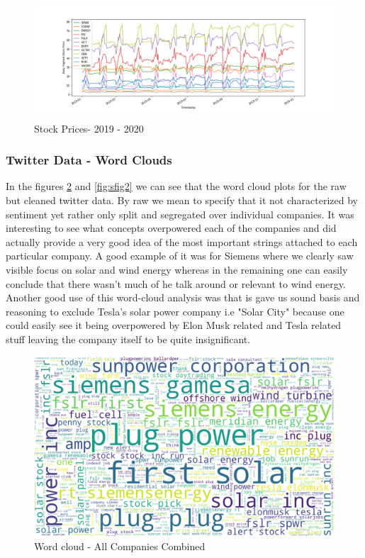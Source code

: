 \documentclass[sigconf, nonacm]{acmart}
\begin{document}
\begin{figure}[H]
  \centering
  \includegraphics[width=\linewidth]{images/stock_prices_all_2019t20.png}
  \caption{Stock Prices- 2019 - 2020}
  \label{stock_prices_all_2019t20}
\end{figure}




\subsubsection{Twitter Data - Word Clouds}
In the figures \ref{complete_wordcloud2} and \ref{fig:sfig2} we can see that the word cloud plots for the raw but cleaned twitter data. By raw we mean to specify that it not characterized by sentiment yet rather only split and segregated over individual companies. It was interesting to see what concepts overpowered each of the companies and did actually provide a very good idea of the most important strings attached to each particular company. A good example of it was for Siemens where we clearly saw visible focus on solar and wind energy whereas in the remaining one can easily conclude that there wasn't much of he talk around or relevant to wind energy. Another good use of this word-cloud analysis was that is gave us sound basis and reasoning to exclude Tesla's solar power company i.e "Solar City" because one could easily see it being overpowered by Elon Musk related and Tesla related stuff leaving the company itself to be quite insignificant. 

\begin{figure}[H]
  \centering
  \includegraphics[width=1\linewidth]{images/complete_wordcloud2.png}
  \caption{Word cloud - All Companies Combined}
  \label{complete_wordcloud2}
\end{figure}
\end{document}
